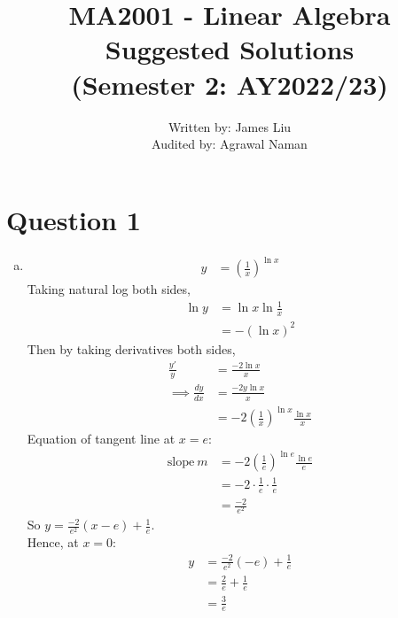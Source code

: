 \documentclass[11pt]{article}
\title{%
  MA2001 - Linear Algebra Suggested Solutions  \\ 
  \large (Semester 2: AY2022/23) \\ }
\author{%
  \large
    Written by: James Liu \\
    Audited by: Agrawal Naman}
\date{}
\begin{document}

\maketitle

\section*{Question 1}
\begin{enumerate}[(a)]
    \item 
    \begin{align*}
        y &= \left(\frac{1}{x}\right)^{\ln x}
    \end{align*}
    Taking natural log both sides, 
    \begin{align*}
        \ln y &= \ln x \ln \frac{1}{x} \\
        &= -(\ln x)^2 
    \end{align*}
    Then by taking derivatives both sides,
    \begin{align*}
        \frac{y'}{y} &= \frac{-2\ln x}{x}\\
        \implies \frac{dy}{dx} &= \frac{-2y\ln x}{x}\\
        &= -2\left(\frac{1}{x}\right)^{\ln x} \frac{\ln x}{x}   
    \end{align*}
    Equation of tangent line at $x=e$: 
    \begin{align*}
        \text{slope} \ m &= -2\left(\frac{1}{e}\right)^{\ln e}\frac{\ln e}{e}\\
        &= -2\cdot \frac{1}{e}\cdot \frac{1}{e}\\
        &= \frac{-2}{e^2}
    \end{align*}
    So $\displaystyle y= \frac{-2}{e^2}(x-e)+\frac{1}{e}$. \\
    Hence, at $x=0$: \begin{align*}
        y&= \frac{-2}{e^2}(-e)+\frac{1}{e}\\
        &= \frac{2}{e}+\frac{1}{e}\\
        &= \frac{3}{e}
    \end{align*}
    

\end{enumerate}
\end{document}
